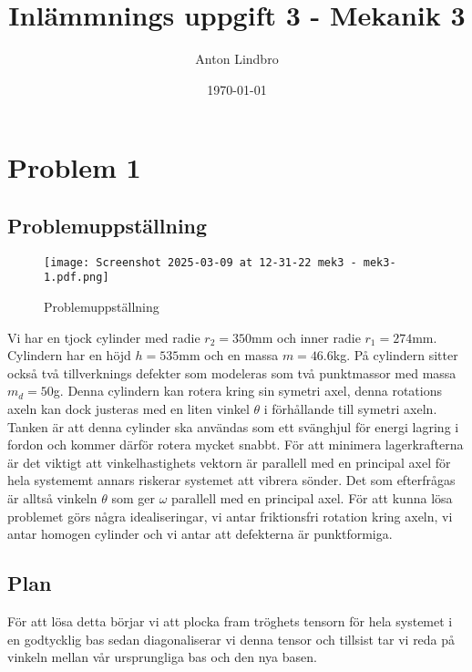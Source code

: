 \documentclass[a4paper]{article}
\title{Inlämmnings uppgift 3 - Mekanik 3}
\author{Anton Lindbro}
\date{\today}
\begin{document}
\maketitle

\section*{Problem 1}

\subsection*{Problemuppställning}

\begin{figure}[H]
    \begin{small}
        \begin{center}
            \texttt{[image: Screenshot 2025-03-09 at 12-31-22 mek3 - mek3-1.pdf.png]}
        \end{center}
        \caption{Problemuppställning}
        \label{fig:uppställning1}
    \end{small}
\end{figure}

Vi har en tjock cylinder med radie $r_2 = 350$mm och inner radie $r_1 = 274$mm. Cylindern har en höjd $h = 535$mm och en massa $m = 46.6$kg. På cylindern sitter också två tillverknings defekter som modeleras som två punktmassor med massa $m_d = 50$g. Denna cylindern kan rotera kring sin symetri axel, denna rotations axeln kan dock justeras med en liten vinkel $\theta$ i förhållande till symetri axeln. Tanken är att denna cylinder ska användas som ett svänghjul för energi lagring i fordon och kommer därför rotera mycket snabbt. För att minimera lagerkrafterna är det viktigt att vinkelhastighets vektorn är parallell med en principal axel för hela systememt annars riskerar systemet att vibrera sönder. Det som efterfrågas är alltså vinkeln $\theta$ som ger $\omega$ parallell med en principal axel. För att kunna lösa problemet görs några idealiseringar, vi antar friktionsfri rotation kring axeln, vi antar homogen cylinder och vi antar att defekterna är punktformiga. 

\subsection*{Plan}

För att lösa detta börjar vi att plocka fram tröghets tensorn för hela systemet i en godtycklig bas sedan diagonaliserar vi denna tensor och tillsist tar vi reda på vinkeln mellan vår ursprungliga bas och den nya basen.
\end{document}
